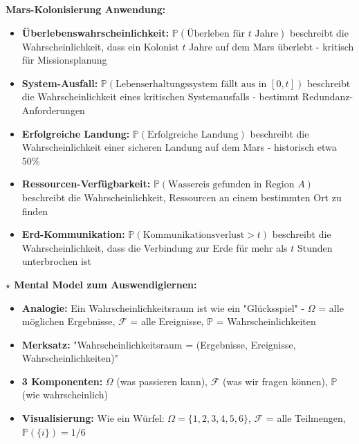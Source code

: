 \begin{denoobification}[Wahrscheinlichkeitsmaß]
\textbf{Mars-Kolonisierung Anwendung:}
\begin{itemize}
    \item \textbf{Überlebenswahrscheinlichkeit:} $\mathbb{P}(\text{Überleben für } t \text{ Jahre})$ beschreibt die Wahrscheinlichkeit, dass ein Kolonist $t$ Jahre auf dem Mars überlebt - kritisch für Missionsplanung
    \item \textbf{System-Ausfall:} $\mathbb{P}(\text{Lebenserhaltungssystem fällt aus in } [0,t])$ beschreibt die Wahrscheinlichkeit eines kritischen Systemausfalls - bestimmt Redundanz-Anforderungen
    \item \textbf{Erfolgreiche Landung:} $\mathbb{P}(\text{Erfolgreiche Landung})$ beschreibt die Wahrscheinlichkeit einer sicheren Landung auf dem Mars - historisch etwa 50\%
    \item \textbf{Ressourcen-Verfügbarkeit:} $\mathbb{P}(\text{Wassereis gefunden in Region } A)$ beschreibt die Wahrscheinlichkeit, Ressourcen an einem bestimmten Ort zu finden
    \item \textbf{Erd-Kommunikation:} $\mathbb{P}(\text{Kommunikationsverlust} > t)$ beschreibt die Wahrscheinlichkeit, dass die Verbindung zur Erde für mehr als $t$ Stunden unterbrochen ist
\end{itemize}

\textbf{$\star$ Mental Model zum Auswendiglernen:}
\begin{itemize}
    \item \textbf{Analogie:} Ein Wahrscheinlichkeitsraum ist wie ein "Glücksspiel" - $\Omega$ = alle möglichen Ergebnisse, $\mathcal{F}$ = alle Ereignisse, $\mathbb{P}$ = Wahrscheinlichkeiten
    \item \textbf{Merksatz:} "Wahrscheinlichkeitsraum = (Ergebnisse, Ereignisse, Wahrscheinlichkeiten)"
    \item \textbf{3 Komponenten:} $\Omega$ (was passieren kann), $\mathcal{F}$ (was wir fragen können), $\mathbb{P}$ (wie wahrscheinlich)
    \item \textbf{Visualisierung:} Wie ein Würfel: $\Omega = \{1,2,3,4,5,6\}$, $\mathcal{F}$ = alle Teilmengen, $\mathbb{P}(\{i\}) = 1/6$
\end{itemize}

\begin{center}
\end{center}
\end{denoobification}
